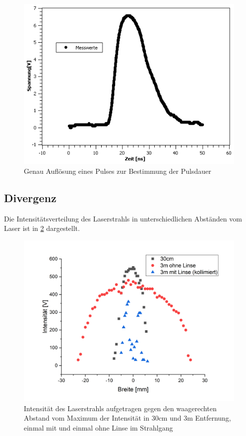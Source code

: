 \documentclass[
	a4paper,
	12pt,
	pagesize,
	ngerman
]{scrartcl}
\begin{document}
\begin{figure}[h!]
	\centering
	\includegraphics[scale=0.7]{Pulsdauer.png}
	\caption{Genau Auflösung eines Pulses zur Bestimmung der Pulsdauer}
	\label{Pulsdauer}
\end{figure}

\subsection{Divergenz}
Die Intensitätsverteilung des Laserstrahls in unterschiedlichen Abständen vom Laser ist in \cref{breite} dargestellt.

\begin{figure}[h!]
	\centering
	\includegraphics[scale=0.5]{breite.png}
	\caption{Intensität des Laserstrahls aufgetragen gegen den waagerechten Abstand vom Maximum der Intensität in 30cm und 3m Entfernung, einmal mit und einmal ohne Linse im Strahlgang}
	\label{breite}
\end{figure}
\end{document}
